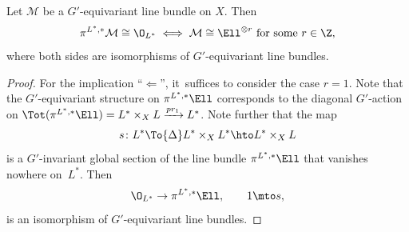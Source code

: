 \begin{lem} \label{lem:invariantSection}
Let $\mathcal M$ be a $G'$-equivariant line bundle on $X$. Then
\[
\pi^{L^*,*} \mathcal M \cong \O_{L^*} \iff \mathcal M \cong \Ell^{\otimes r} \text{ for some $r \in \Z$},
\]
where both sides are isomorphisms of $G'$-equivariant line bundles.
\end{lem}

\begin{proof}
For the implication ``$\Leftarrow$'', it~suffices to consider the case $r = 1$. Note that the $G'$-equivariant structure on $\pi^{L^*,*} \Ell$ corresponds to the diagonal $G'$-action on $\Tot(\pi^{L^*,*} \Ell) = L^* \times_X L \xrightarrow{pr_1} L^*$. Note further that the map
\[
s \colon L^* \To{\Delta} L^* \times_X L^* \hto L^* \times_X L
\]
is a $G'$-invariant global section of the line bundle $\pi^{L^*,*} \Ell$ that vanishes nowhere on~$L^*$. Then
\[
\O_{L^*} \to \pi^{L^*,*} \Ell, \qquad 1 \mto s,
\]
is an isomorphism of $G'$-equivariant line bundles.


\end{proof}

